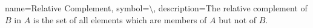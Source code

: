 
{
    name={Relative Complement},
    symbol={\ensuremath{\setminus}},
    description={The relative complement of $B$ in $A$ is the set of all elements which are members of $A$ but not of $B$.}
}
